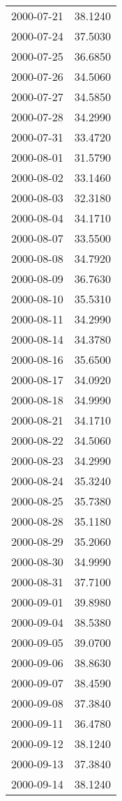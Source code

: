 \begin{tabular}{lr}
2000-07-21 &     38.1240 \\
2000-07-24 &     37.5030 \\
2000-07-25 &     36.6850 \\
2000-07-26 &     34.5060 \\
2000-07-27 &     34.5850 \\
2000-07-28 &     34.2990 \\
2000-07-31 &     33.4720 \\
2000-08-01 &     31.5790 \\
2000-08-02 &     33.1460 \\
2000-08-03 &     32.3180 \\
2000-08-04 &     34.1710 \\
2000-08-07 &     33.5500 \\
2000-08-08 &     34.7920 \\
2000-08-09 &     36.7630 \\
2000-08-10 &     35.5310 \\
2000-08-11 &     34.2990 \\
2000-08-14 &     34.3780 \\
2000-08-16 &     35.6500 \\
2000-08-17 &     34.0920 \\
2000-08-18 &     34.9990 \\
2000-08-21 &     34.1710 \\
2000-08-22 &     34.5060 \\
2000-08-23 &     34.2990 \\
2000-08-24 &     35.3240 \\
2000-08-25 &     35.7380 \\
2000-08-28 &     35.1180 \\
2000-08-29 &     35.2060 \\
2000-08-30 &     34.9990 \\
2000-08-31 &     37.7100 \\
2000-09-01 &     39.8980 \\
2000-09-04 &     38.5380 \\
2000-09-05 &     39.0700 \\
2000-09-06 &     38.8630 \\
2000-09-07 &     38.4590 \\
2000-09-08 &     37.3840 \\
2000-09-11 &     36.4780 \\
2000-09-12 &     38.1240 \\
2000-09-13 &     37.3840 \\
2000-09-14 &     38.1240 \\

\end{tabular}
